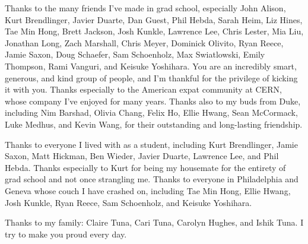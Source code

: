 Thanks to the many friends I've made in grad school, especially John Alison, Kurt Brendlinger, Javier Duarte, Dan Guest, Phil Hebda, Sarah Heim, Liz Hines, Tae Min Hong, Brett Jackson, Josh Kunkle, Lawrence Lee, Chris Lester, Mia Liu, Jonathan Long, Zach Marshall, Chris Meyer, Dominick Olivito, Ryan Reece, Jamie Saxon, Doug Schaefer, Sam Schoenholz, Max Swiatlowski, Emily Thompson, Rami Vanguri, and Keisuke Yoshihara. You are an incredibly smart, generous, and kind group of people, and I'm thankful for the privilege of kicking it with you. Thanks especially to the American expat community at CERN, whose company I've enjoyed for many years. Thanks also to my buds from Duke, including Nim Barshad, Olivia Chang, Felix Ho, Ellie Hwang, Sean McCormack, Luke Medhus, and Kevin Wang, for their outstanding and long-lasting friendship.

Thanks to everyone I lived with as a student, including Kurt Brendlinger, Jamie Saxon, Matt Hickman, Ben Wieder, Javier Duarte, Lawrence Lee, and Phil Hebda. Thanks especially to Kurt for being my housemate for the entirety of grad school and not once strangling me. Thanks to everyone in Philadelphia and Geneva whose couch I have crashed on, including Tae Min Hong, Ellie Hwang, Josh Kunkle, Ryan Reece, Sam Schoenholz, and Keisuke Yoshihara.

Thanks to my family: Claire Tuna, Cari Tuna, Carolyn Hughes, and Ishik Tuna. I try to make you proud every day.

